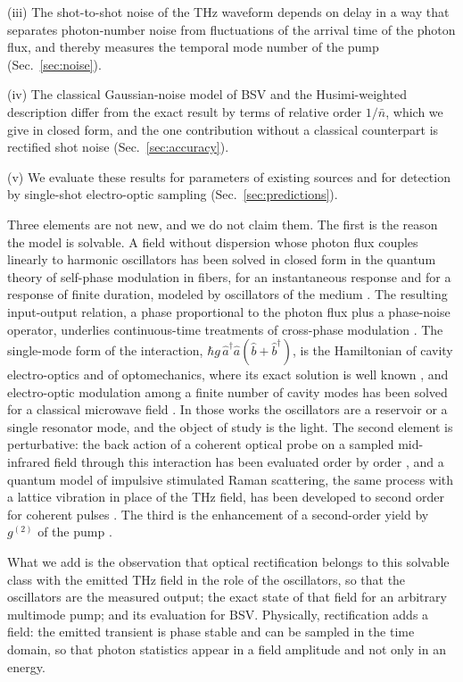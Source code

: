 \documentclass[aps,pra,reprint,superscriptaddress,amsmath,amssymb,floatfix]{revtex4-2}
\newcommand{\nbar}{\bar n}
\begin{document}
(iii) The shot-to-shot noise of the THz waveform depends on delay in a way
that separates photon-number noise from fluctuations of the arrival time of
the photon flux, and thereby measures the temporal mode number of the pump
(Sec.~\ref{sec:noise}).

(iv) The classical Gaussian-noise model of BSV and the Husimi-weighted
description differ from the exact result by terms of relative order
$1/\nbar$, which we give in closed form, and the one contribution without a
classical counterpart is rectified shot noise (Sec.~\ref{sec:accuracy}).

(v) We evaluate these results for parameters of existing sources and for
detection by single-shot electro-optic sampling (Sec.~\ref{sec:predictions}).

Three elements are not new, and we do not claim them. The first is the
reason the model is solvable. A field without dispersion whose photon flux
couples linearly to harmonic oscillators has been solved in closed form in
the quantum theory of self-phase modulation in fibers, for an instantaneous
response \cite{blow1991} and for a response of finite duration, modeled by
oscillators of the medium \cite{boivin1994}. The resulting input-output
relation, a phase proportional to the photon flux plus a phase-noise
operator, underlies continuous-time treatments of cross-phase modulation
\cite{shapirorazavi2007}. The single-mode form of the interaction,
$\hbar g\,\hat a^\dagger\hat a(\hat b+\hat b^\dagger)$, is the Hamiltonian of
cavity electro-optics \cite{tsang2010,tsang2011} and of optomechanics, where
its exact solution is well known \cite{bose1997}, and electro-optic
modulation among a finite number of cavity modes has been solved for a
classical microwave field \cite{miroshnichenko2017}. In those works the
oscillators are a reservoir or a single resonator mode, and the object of
study is the light. The second element is perturbative: the back action of a
coherent optical probe on a sampled mid-infrared field through this
interaction has been evaluated order by order \cite{guedes2022}, and a quantum
model of impulsive stimulated Raman scattering, the same process with a
lattice vibration in place of the THz field, has been developed to second
order for coherent pulses \cite{glerean2019}. The third is the enhancement of
a second-order yield by $g^{(2)}$ of the pump \cite{spasibko2017}.

What we add is the observation that optical rectification belongs to this
solvable class with the emitted THz field in the role of the oscillators, so
that the oscillators are the measured output; the exact state of that field
for an arbitrary multimode pump; and its evaluation for BSV. Physically,
rectification adds a field: the emitted transient is phase stable and can be
sampled in the time domain, so that photon statistics appear in a field
amplitude and not only in an energy.
\end{document}
